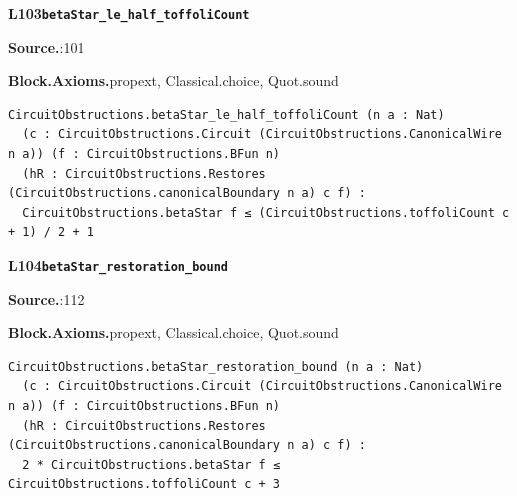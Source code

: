 \par\medskip\noindent\begin{minipage}{\textwidth}
{\small\bfseries L103\enspace\texttt{betaStar\_le\_half\_toffoliCount}\par}
{\footnotesize\raggedright\textbf{Source.}\enspace{}:101\par
\textbf{Block.}\quad\textbf{Axioms.}\enspace propext, Classical.choice, Quot.sound\par}\nopagebreak
\begin{lstlisting}
CircuitObstructions.betaStar_le_half_toffoliCount (n a : Nat)
  (c : CircuitObstructions.Circuit (CircuitObstructions.CanonicalWire n a)) (f : CircuitObstructions.BFun n)
  (hR : CircuitObstructions.Restores (CircuitObstructions.canonicalBoundary n a) c f) :
  CircuitObstructions.betaStar f ≤ (CircuitObstructions.toffoliCount c + 1) / 2 + 1
\end{lstlisting}
\end{minipage}\par

\par\medskip\noindent\begin{minipage}{\textwidth}
{\small\bfseries L104\enspace\texttt{betaStar\_restoration\_bound}\par}
{\footnotesize\raggedright\textbf{Source.}\enspace{}:112\par
\textbf{Block.}\quad\textbf{Axioms.}\enspace propext, Classical.choice, Quot.sound\par}\nopagebreak
\begin{lstlisting}
CircuitObstructions.betaStar_restoration_bound (n a : Nat)
  (c : CircuitObstructions.Circuit (CircuitObstructions.CanonicalWire n a)) (f : CircuitObstructions.BFun n)
  (hR : CircuitObstructions.Restores (CircuitObstructions.canonicalBoundary n a) c f) :
  2 * CircuitObstructions.betaStar f ≤ CircuitObstructions.toffoliCount c + 3
\end{lstlisting}
\end{minipage}\par

